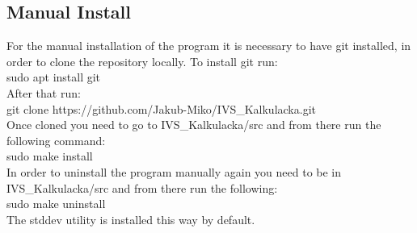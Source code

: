 \documentclass{article}
\begin{document}
	\subsection{Manual Install}
	For the manual installation of the program it is necessary to have git installed, in order to clone the repository locally. To install git run:\\
	sudo apt install git\\
	After that run:\\
	git clone https://github.com/Jakub-Miko/IVS\_Kalkulacka.git\\
	Once cloned you need to go to IVS\_Kalkulacka/src and from there run the following command:\\
	sudo make install\\
	In order to uninstall the program manually again you need to be in IVS\_Kalkulacka/src and from there run the following:\\
	sudo make uninstall\\
	The stddev utility is installed this way by default.
	\newpage
	
\end{document}
